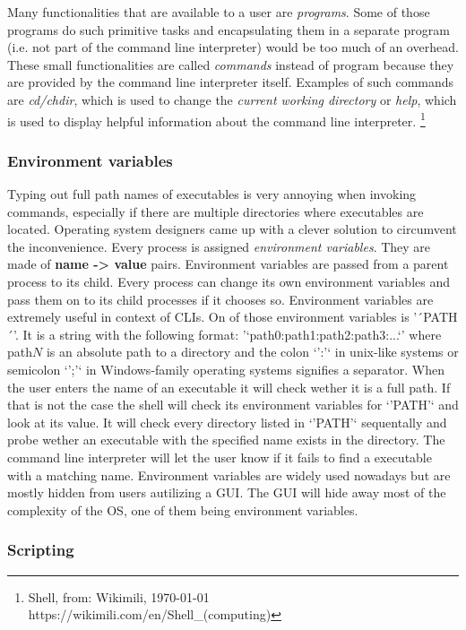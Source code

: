 Many functionalities that are available to a user are \textit{programs}. Some of those programs do such primitive
tasks and encapsulating them in a separate program (i.e. not part of the command line interpreter) would
be too much of an overhead. These small functionalities are called \textit{commands} instead of program because
they are provided by the command line interpreter itself. Examples of such commands are \textit{cd/chdir}, which
is used to change the \textit{current working directory} or \textit{help}, which is used to display helpful information
about the command line interpreter. \footnote{Shell, from: Wikimili, \today \\ https://wikimili.com/en/Shell_(computing)}

\subsubsection{Environment variables}

Typing out full path names of executables is very annoying when invoking commands, especially if there
are multiple directories where executables are located. Operating system designers came up with a clever
solution to circumvent the inconvenience. Every process is assigned \textit{environment variables}. They are
made of \textbf{name -> value} pairs. Environment variables are passed from a parent process to its child.
Every process can change its own environment variables and pass them on to its child processes if it
chooses so. Environment variables are extremely useful in context of CLIs. On of those environment
variables is '´PATH´'. It is a string with the following format: '`path0:path1:path2:path3:...`' where
path$N$ is an absolute path to a directory and the colon `':'` in unix-like systems or semicolon `';'`
in Windows-family operating systems signifies a separator. When the user enters the name of an 
executable it will check wether it is a full path. If that is not the case the shell will check its
environment variables for `'PATH'` and look at its value. It will check every directory listed in
`'PATH'` sequentally and probe wether an executable with the specified name exists in the directory.
The command line interpreter will let the user know if it fails to find a executable with a matching
name. Environment variables are widely used nowadays but are mostly hidden from users autilizing a GUI.
The GUI will hide away most of the complexity of the OS, one of them being environment variables.


\subsubsection{Scripting}

